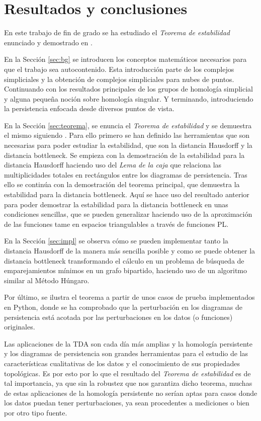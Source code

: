 \chapter{Resultados y conclusiones}
En este trabajo de fin de grado se ha estudiado el \emph{Teorema de estabilidad} enunciado y demostrado en \cite{Cohen-Steiner2007}.

En la Sección \ref{sec:bg} se introducen los conceptos matemáticos necesarios para que el trabajo sea autocontenido. Esta introducción parte de los complejos simpliciales y la obtención de complejos simpliciales para nubes de puntos. Continuando con los resultados principales de los grupos de homología simplicial y alguna pequeña noción sobre homología singular. Y terminando, introduciendo la persistencia enfocada desde diversos puntos de vista.

En la Sección \ref{sec:teorema}, se enuncia el \emph{Teorema de estabilidad} y se demuestra el mismo siguiendo \cite{Cohen-Steiner2007}. Para ello primero se han definido las herramientas que son necesarias para poder estudiar la estabilidad, que son la distancia Hausdorff y la distancia bottleneck. Se empieza con la demostración de la estabilidad para la distancia Hausdorff haciendo uso del \emph{Lema de la caja} que relaciona las multiplicidades totales en rectángulos entre los diagramas de persistencia. Tras ello se continúa con la demostración del teorema principal, que demuestra la estabilidad para la distancia bottleneck. Aquí se hace uso del resultado anterior para poder demostrar la estabilidad para la distancia bottleneck en unas condiciones sencillas, que se pueden generalizar haciendo uso de la aproximación de las funciones tame en espacios triangulables a través de funciones PL.

En la Sección \ref{sec:impl} se observa cómo se pueden implementar tanto la distancia Hausdorff de la manera más sencilla posible y como se puede obtener la distancia bottleneck transformando el cálculo en un problema de búsqueda de emparejamientos mínimos en un grafo bipartido, haciendo uso de un algoritmo similar al Método Húngaro.

Por último, se ilustra el teorema a partir de unos casos de prueba implementados en Python, donde se ha comprobado que la perturbación en los diagramas de persistencia está acotada por las perturbaciones en los datos (o funciones) originales.

Las aplicaciones de la TDA son cada día más amplias y la homología persistente y los diagramas de persistencia son grandes herramientas para el estudio de las características cualitativas de los datos y el conocimiento de sus propiedades topológicas. Es por esto por lo que el resultado del \emph{Teorema de estabilidad} es de tal importancia, ya que sin la robustez que nos garantiza dicho teorema, muchas de estas aplicaciones de la homología persistente no serían aptas para casos donde los datos puedan tener perturbaciones, ya sean procedentes a mediciones o bien por otro tipo fuente. 